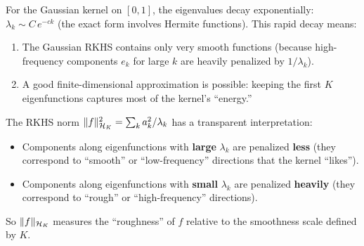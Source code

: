\begin{notechapter}
\begin{examplebox}
For the Gaussian kernel on $[0,1]$, the eigenvalues decay exponentially:
$\lambda_k \sim C\,e^{-c k}$ (the exact form involves Hermite
functions). This rapid decay means:

\begin{enumerate}
  \item The Gaussian RKHS contains only very smooth functions (because
  high-frequency components $e_k$ for large $k$ are heavily penalized by
  $1/\lambda_k$).
  \item A good finite-dimensional approximation is possible: keeping the
  first $K$ eigenfunctions captures most of the kernel's ``energy.''
\end{enumerate}
\end{examplebox}

\begin{insightbox}
The RKHS norm $\| f \|_{\mathcal{H}_K}^2 = \sum_k a_k^2/\lambda_k$ has a
transparent interpretation:
\begin{itemize}
  \item Components along eigenfunctions with \textbf{large} $\lambda_k$
  are penalized \textbf{less} (they correspond to ``smooth'' or
  ``low-frequency'' directions that the kernel ``likes'').
  \item Components along eigenfunctions with \textbf{small} $\lambda_k$
  are penalized \textbf{heavily} (they correspond to ``rough'' or
  ``high-frequency'' directions).
\end{itemize}
So $\| f \|_{\mathcal{H}_K}$ measures the ``roughness'' of $f$ relative to the
smoothness scale defined by $K$.
\end{insightbox}
%
\begin{figure}[h]
\centering
{}
\end{figure}
\end{notechapter}
